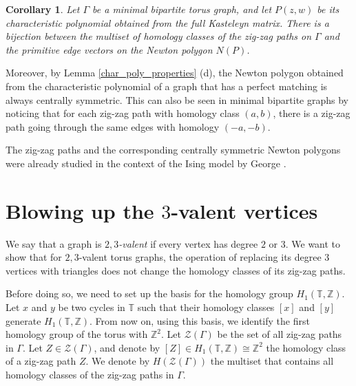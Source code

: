 \documentclass[12pt,a4paper]{article}
\newtheorem{cor}[thm]{Corollary}
\theoremstyle{definition}
\begin{document}
\begin{cor} \label{NPs and homology classes}
    Let $\Gamma$ be a minimal bipartite torus graph, and let $P(z,w)$ be its characteristic polynomial obtained from the full Kasteleyn matrix. There is a bijection between the multiset of homology classes of the zig-zag paths on $\Gamma$ and the primitive edge vectors on the Newton polygon $N(P)$. 
\end{cor}

Moreover, by Lemma \ref{char_poly_properties} (d), the Newton polygon obtained from the characteristic polynomial of a graph that has a perfect matching is always centrally symmetric. This can also be seen in minimal bipartite graphs by noticing that for each zig-zag path with homology class $(a,b)$, there is a zig-zag path going through the same edges with homology $(-a,-b)$.

The zig-zag paths and the corresponding centrally symmetric Newton polygons were already studied in the context of the Ising model by George \cite{George25}.


\section{Blowing up the $3$-valent vertices} \label{trunc_graphs}

We say that a graph is \emph{$2,3$-valent} if every vertex has degree $2$ or $3$. We want to show that for $2,3$-valent torus graphs, the operation of replacing its degree $3$ vertices with triangles does not change the homology classes of its zig-zag paths. 

Before doing so, we need to set up the basis for the homology group $H_1(\mathbb{T},\mathbb{Z})$. Let $x$ and $y$ be two cycles in $\mathbb{T}$ such that their homology classes $[x]$ and $[y]$ generate $H_1(\mathbb{T},\mathbb{Z})$. From now on, using this basis, we identify the first homology group of the torus with $\mathbb{Z}^2$. Let $\mathcal{Z}(\Gamma)$ be the set of all zig-zag paths in $\Gamma$. Let $Z \in \mathcal{Z}(\Gamma)$, and denote by $[Z] \in H_1(\mathbb{T},\mathbb{Z}) \cong \mathbb{Z}^2$ the homology class of a zig-zag path $Z$. We denote by $H(\mathcal{Z}(\Gamma))$ the multiset that contains all homology classes of the zig-zag paths in $\Gamma$. 
\end{document}
